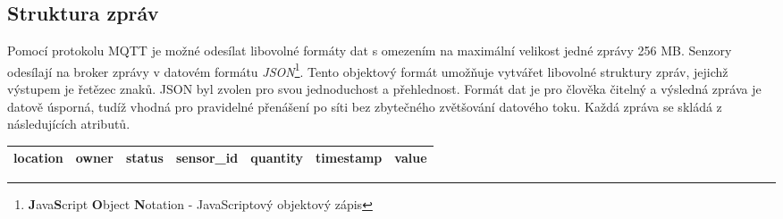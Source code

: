 \subsection{Struktura zpráv} \label{subsec:message_structure}
Pomocí protokolu MQTT je možné odesílat libovolné formáty dat s omezením na maximální velikost jedné zprávy 256 MB. Senzory odesílají na broker zprávy v datovém formátu \textit{JSON}\footnote{\textbf{J}ava\textbf{S}cript \textbf{O}bject \textbf{N}otation - JavaScriptový objektový zápis}. Tento objektový formát umožňuje vytvářet libovolné struktury zpráv, jejichž výstupem je řetězec znaků. JSON byl zvolen pro svou jednoduchost a přehlednost. Formát dat je pro člověka čitelný a výsledná zpráva je datově úsporná, tudíž vhodná pro pravidelné přenášení po síti bez zbytečného zvětšování datového toku. Každá zpráva se skládá z následujících atributů.

\begin{table}[h!]
\centering
\begin{tabular}{|c|c|c|c|c|c|c|} 
 \hline
 location & owner & status & sensor\_id & quantity & timestamp & value \\
 \hline
\end{tabular}
\end{table}

